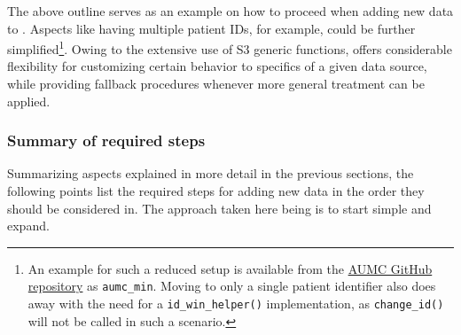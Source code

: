 \documentclass[
  notitle,
  nojss,
  noheadings]{jss}
\begin{document}
The above outline serves as an example on how to proceed when adding new
data to . Aspects like having multiple patient IDs, for
example, could be further simplified\footnote{An example for such a
  reduced setup is available from the
  \href{https://github.com/eth-mds/aumc}{AUMC GitHub repository} as
  \texttt{aumc\_min}. Moving to only a single patient identifier also
  does away with the need for a \texttt{id\_win\_helper()}
  implementation, as \texttt{change\_id()} will not be called in such a
  scenario.}. Owing to the extensive use of S3 generic functions,
 offers considerable flexibility for customizing certain
behavior to specifics of a given data source, while providing fallback
procedures whenever more general treatment can be applied.

\hypertarget{summary-of-required-steps}{%
\subsubsection{Summary of required
steps}\label{summary-of-required-steps}}

Summarizing aspects explained in more detail in the previous sections,
the following points list the required steps for adding new data in the
order they should be considered in. The approach taken here being is to
start simple and expand.
\end{document}
